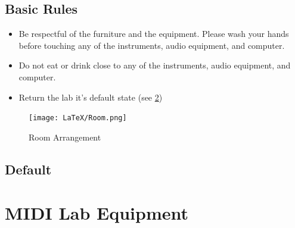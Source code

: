 \documentclass{tufte-book} %
\begin{document}
\section{Basic Rules} 

\begin{itemize}
\item Be respectful of the furniture and the equipment. Please wash your hands before touching any of the instruments, audio equipment, and computer.
\item Do not eat or drink close to any of the instruments, audio equipment, and computer. 
\item Return the lab it's default state (see \ref{Default})
\end{itemize}

\begin{figure}[h]
\centering
\texttt{[image: LaTeX/Room.png]}
\caption{Room Arrangement}
\label{fig:fullfig}
\end{figure}


\section{Default}
\label{Default} 

\chapter{MIDI Lab Equipment}
\label{MIDI Lab Equipment}
\end{document}
